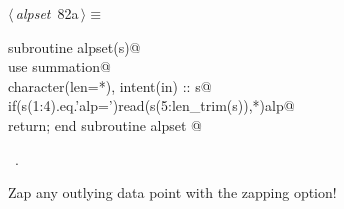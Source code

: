 \documentclass[10pt,a4paper,notitlepage]{article}
\begin{document}
\begin{flushleft} \small
\begin{minipage}{\linewidth}\label{scrap97}\raggedright\small
{} $\langle\,${\it alpset}\nobreak\ {\footnotesize {82a}}$\,\rangle\equiv$
\vspace{-1ex}
\begin{list}{}{} \item
\mbox{}\verb@      subroutine alpset(s)@\\
\mbox{}\verb@      use summation@\\
\mbox{}\verb@      character(len=*), intent(in) :: s@\\
\mbox{}\verb@      if(s(1:4).eq.'alp=')read(s(5:len_trim(s)),*)alp@\\
\mbox{}\verb@      return; end subroutine alpset                                        @{\NWsep}
\end{list}
\vspace{-1.5ex}
\footnotesize
\begin{list}{}{\setlength{\itemsep}{-\parsep}\setlength{\itemindent}{-\leftmargin}}
\item \NWtxtMacroRefIn\ .

\item{}
\end{list}
\end{minipage}\vspace{4ex}
\end{flushleft}
Zap any outlying data point with the zapping option!
\end{document}
